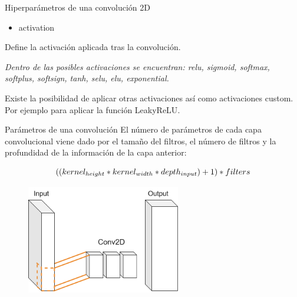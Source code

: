 \begin{frame}{Hiperparámetros de una convolución 2D}
\begin{itemize}
    \item \alert{\Large activation}
\end{itemize}

Define la \alert{activación} aplicada tras la convolución.

\textit{Dentro de las posibles activaciones se encuentran: relu, sigmoid, softmax, softplus, softsign, tanh, selu, elu, exponential.}

Existe la posibilidad de aplicar \alert{otras} activaciones así como activaciones \alert{custom}. Por ejemplo para aplicar la función \alert{LeakyReLU}.

\end{frame}

\begin{frame}{Parámetros de una convolución}
El número de parámetros de cada \alert{capa convolucional} viene dado por el tamaño del \alert{filtros}, el número de \alert{filtros} y la \alert{profundidad} de la información de la capa anterior:

\begin{equation}
    {\large ((kernel_{height} * kernel_{width} * depth_{input}) + 1) * filters}
\end{equation}

\begin{figure}
    \centering
    \includegraphics[width=0.6\textwidth]{figures/Tema 3/ConvParams.png}
\end{figure}
\end{frame}

